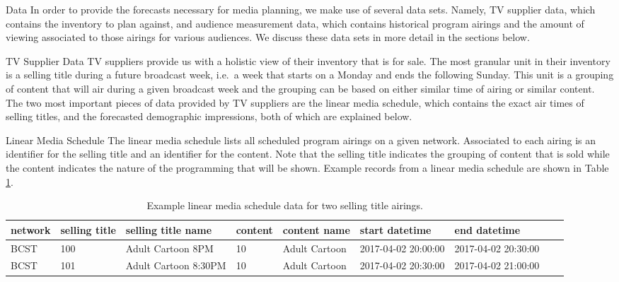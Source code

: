 \begin{chapter}{Data}\label{data}
  In order to provide the forecasts necessary for media planning, we make use
  of several data sets. Namely, TV supplier data, which contains the inventory to plan against, and
  audience measurement data, which contains historical program airings and the
  amount of viewing associated to those airings for various audiences. We discuss
  these data sets in more detail in the sections below.

\begin{section}{TV Supplier Data}
  TV suppliers provide us with a holistic view of their inventory that is for sale.
  The most granular unit in their inventory is a selling title during a future broadcast week, i.e.\ a
  week that starts on a Monday and ends the following Sunday. This
  unit is a grouping of content that will air during a given broadcast week and the grouping can be
  based on either similar time of airing or similar content. The two most important
  pieces of data provided by TV suppliers are the linear media schedule, which contains the exact air times of
  selling titles, and the forecasted demographic impressions, both of which are explained below.

  \begin{subsection}{Linear Media Schedule}
    The linear media schedule lists all scheduled program airings on a given network.
    Associated to each airing is an identifier for the selling title and an identifier for the content.
    Note that the selling title indicates the grouping of content that is sold while the content
    indicates the nature of the programming that will be shown. Example records
    from a linear media schedule are shown in Table \ref{tab:tvsched}.

    \begin{table}[h!]
      \centering
      \begin{adjustbox}{width=1.1\textwidth,center=\textwidth}
        \large
        \begin{tabular}{lllllllll}
          network & selling title & selling title name & content & content name & start datetime & end datetime \\
          \hline
          BCST & 100 & Adult Cartoon 8PM & 10 & Adult Cartoon & 2017-04-02 20:00:00 & 2017-04-02 20:30:00 \\
          BCST & 101 & Adult Cartoon 8:30PM & 10 & Adult Cartoon & 2017-04-02 20:30:00 & 2017-04-02 21:00:00 \\
        \end{tabular}
      \end{adjustbox}
      \caption{Example linear media schedule data for two selling title airings.}\label{tab:tvsched}
    \end{table}


\end{subsection}
\end{section}
\end{chapter}
